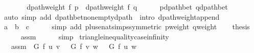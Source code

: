 \begin{isabellebody}
\ \ \isamarkupfalse%
\ \isamarkupfalse%
\ {\isachardoublequoteopen}{\isachardot}{\kern0pt}{\isachardot}{\kern0pt}{\isachardot}{\kern0pt}\ {\isacharequal}{\kern0pt}\ dpath{\isacharunderscore}{\kern0pt}weight\ f\ p\ {\isacharplus}{\kern0pt}\ dpath{\isacharunderscore}{\kern0pt}weight\ f\ q{\isachardoublequoteclose}\isanewline
\ \ \ \ \isamarkupfalse%
\ p{\isacharunderscore}{\kern0pt}dpath{\isacharunderscore}{\kern0pt}bet\ q{\isacharunderscore}{\kern0pt}dpath{\isacharunderscore}{\kern0pt}bet\isanewline
\ \ \ \ \isamarkupfalse%
\ {\isacharparenleft}{\kern0pt}auto\ simp\ add{\isacharcolon}{\kern0pt}\ dpath{\isacharunderscore}{\kern0pt}bet{\isacharunderscore}{\kern0pt}nonempty{\isacharunderscore}{\kern0pt}dpath{\isacharparenleft}{\kern0pt}{}{\isacharcomma}{\kern0pt}\ {}{\isacharparenright}{\kern0pt}\ intro{\isacharcolon}{\kern0pt}\ dpath{\isacharunderscore}{\kern0pt}weight{\isacharunderscore}{\kern0pt}append{\isacharunderscore}{\kern0pt}{}{\isacharparenright}{\kern0pt}\isanewline
\ \ \isamarkupfalse%
\ \isamarkupfalse%
\ {\isachardoublequoteopen}{\isacharquery}{\kern0pt}a\ {\isasymle}\ {\isacharquery}{\kern0pt}b\ {\isacharplus}{\kern0pt}\ {\isacharquery}{\kern0pt}c{\isachardoublequoteclose}\isanewline
\ \ \ \ \isamarkupfalse%
\ {\isacharparenleft}{\kern0pt}simp\ add{\isacharcolon}{\kern0pt}\ plus{\isacharunderscore}{\kern0pt}enat{\isacharunderscore}{\kern0pt}simps{\isacharparenleft}{\kern0pt}{}{\isacharparenright}{\kern0pt}{\isacharbrackleft}{\kern0pt}symmetric{\isacharbrackright}{\kern0pt}\ p{\isacharunderscore}{\kern0pt}weight\ q{\isacharunderscore}{\kern0pt}weight{\isacharparenright}{\kern0pt}\isanewline
\ \ \isamarkupfalse%
\ {\isacharquery}{\kern0pt}thesis\isanewline
\ \ \ \ \isamarkupfalse%
\ assm\isanewline
\ \ \ \ \isamarkupfalse%
\ simp\isanewline
{}\isamarkupfalse%
%
\endisatagproof
{\isafoldproof}%
%
\isadelimproof
\isanewline
%
\endisadelimproof
%
\isadeliminvisible
\isanewline
%
\endisadeliminvisible
%
\isataginvisible
{}\isamarkupfalse%
\ {\isasymdelta}{\isacharunderscore}{\kern0pt}triangle{\isacharunderscore}{\kern0pt}inequality{\isacharunderscore}{\kern0pt}case{\isacharunderscore}{\kern0pt}infinity{\isacharcolon}{\kern0pt}\isanewline
\ \ \ assm{\isacharcolon}{\kern0pt}\ {\isachardoublequoteopen}{\isasymdelta}\ G\ f\ u\ v\ {\isacharplus}{\kern0pt}\ {\isasymdelta}\ G\ f\ v\ w\ {\isacharless}{\kern0pt}\ {\isasymdelta}\ G\ f\ u\ w{\isachardoublequoteclose}\isanewline

\end{isabellebody}
